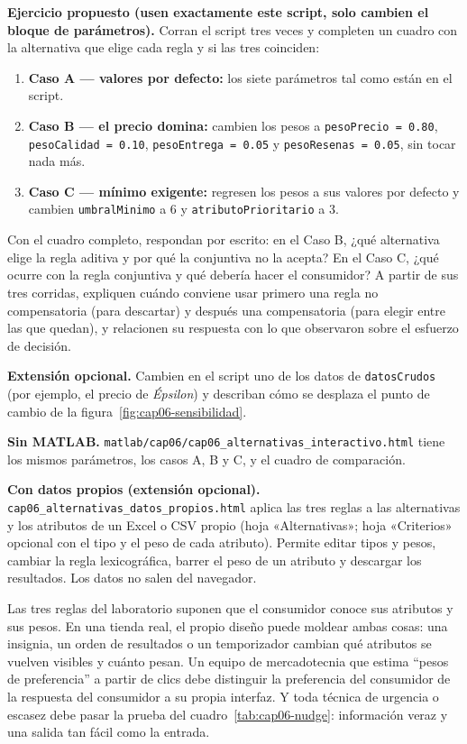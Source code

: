 \begin{cajaLaboratorio}
\textbf{Ejercicio propuesto (usen exactamente este script, solo cambien el
bloque de parámetros).} Corran el script tres veces y completen un cuadro con
la alternativa que elige cada regla y si las tres coinciden:
\begin{enumerate}
  \item \textbf{Caso A — valores por defecto:} los siete parámetros tal como
  están en el script.
  \item \textbf{Caso B — el precio domina:} cambien los pesos a
  \texttt{pesoPrecio = 0.80}, \texttt{pesoCalidad = 0.10},
  \texttt{pesoEntrega = 0.05} y \texttt{pesoResenas = 0.05}, sin tocar nada
  más.
  \item \textbf{Caso C — mínimo exigente:} regresen los pesos a sus valores
  por defecto y cambien \texttt{umbralMinimo} a 6 y
  \texttt{atributoPrioritario} a 3.
\end{enumerate}
Con el cuadro completo, respondan por escrito: en el Caso B, ¿qué
alternativa elige la regla aditiva y por qué la conjuntiva no la acepta? En
el Caso C, ¿qué ocurre con la regla conjuntiva y qué debería hacer el
consumidor? A partir de sus tres corridas, expliquen cuándo conviene usar
primero una regla no compensatoria (para descartar) y después una
compensatoria (para elegir entre las que quedan), y relacionen su respuesta
con lo que \textcite{payne1988adaptive} observaron sobre el esfuerzo de
decisión.

\textbf{Extensión opcional.} Cambien en el script uno de los datos de
\texttt{datosCrudos} (por ejemplo, el precio de \textit{Épsilon}) y
describan cómo se desplaza el punto de cambio de la
figura~\ref{fig:cap06-sensibilidad}.

\textbf{Sin MATLAB.} \texttt{matlab/cap06/cap06\_alternativas\_interactivo.html}
tiene los mismos parámetros, los casos A, B y C, y el cuadro de comparación.

\textbf{Con datos propios (extensión opcional).}
\texttt{cap06\_alternativas\_datos\_propios.html}
aplica las tres reglas a las alternativas y los atributos de un Excel o CSV propio (hoja «Alternativas»; hoja «Criterios» opcional con el tipo y el peso de cada atributo). Permite editar tipos y pesos, cambiar la regla lexicográfica, barrer el peso de un atributo y descargar los resultados. Los datos no salen del navegador.
\end{cajaLaboratorio}

\begin{cajaEtica}
Las tres reglas del laboratorio suponen que el consumidor conoce sus
atributos y sus pesos. En una tienda real, el propio diseño puede moldear
ambas cosas: una insignia, un orden de resultados o un temporizador cambian
qué atributos se vuelven visibles y cuánto pesan. Un equipo de mercadotecnia
que estima \enquote{pesos de preferencia} a partir de clics debe distinguir
la preferencia del consumidor de la respuesta del consumidor a su propia
interfaz. Y toda técnica de urgencia o escasez debe pasar la prueba del
cuadro~\ref{tab:cap06-nudge}: información veraz y una salida tan fácil como
la entrada.
\end{cajaEtica}

